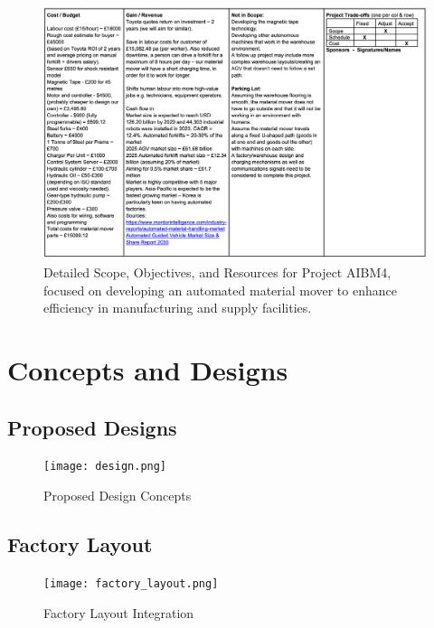 \documentclass[12pt]{article}
\begin{document}
\begin{figure}[h!]
    \centering
     \includegraphics[width=1\textwidth]{scope2.png}
        \caption{Detailed Scope, Objectives, and Resources for Project AIBM4, focused on developing an automated material mover to enhance efficiency in manufacturing and supply facilities.}
         \label{fig:Project Scope Document for AIBM4}
\end{figure}



\newpage

\section{Concepts and Designs}
\subsection{Proposed Designs}
\begin{figure}[h!]
    \centering
    \texttt{[image: design.png]}
    \caption{Proposed Design Concepts}
\end{figure}

\subsection{Factory Layout}
\begin{figure}[h!]
    \centering
    \texttt{[image: factory\_layout.png]}
    \caption{Factory Layout Integration}
\end{figure}

\newpage
\end{document}
